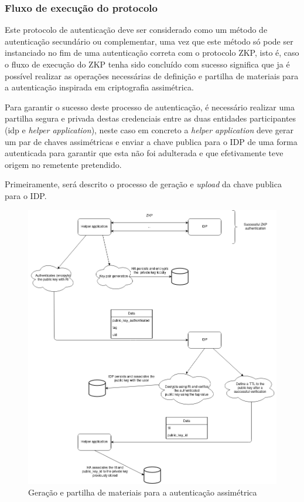 \subsubsection{Fluxo de execução do protocolo}

\quad Este protocolo de autenticação deve ser considerado como um método de autenticação secundário ou complementar, uma vez que este método só pode ser instanciado no fim de uma autenticação correta com o protocolo ZKP, isto é, caso o fluxo de execução do ZKP tenha sido concluído com sucesso significa que ja é possível realizar as operações necessárias de definição e partilha de materiais para a autenticação inspirada em criptografia assimétrica.


\quad Para garantir o sucesso deste processo de autenticação, é necessário realizar uma partilha segura e privada destas credenciais entre as duas entidades participantes (idp e \textit{helper application}), neste caso em concreto a \textit{helper application} deve gerar um par de chaves assimétricas e enviar a chave publica para o IDP de uma forma autenticada para garantir que esta não foi adulterada e que efetivamente teve origem no remetente pretendido. 


\quad Primeiramente, será descrito o processo de geração e \textit{upload} da chave publica para o IDP.
\begin{figure}[H]
    \caption{Geração e partilha de materiais para a autenticação assimétrica}
    \includegraphics[width=\textwidth]{img/pub_key_upload.png}
    \centering
\end{figure}

